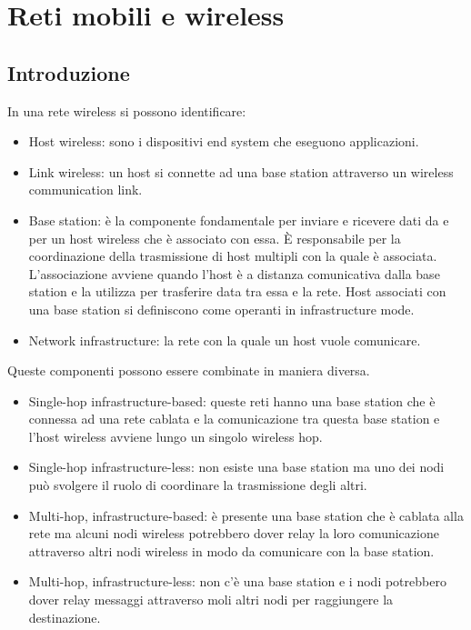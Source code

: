 \chapter{Reti mobili e wireless}
\section{Introduzione}
In  una rete wireless si possono identificare:
\begin{itemize}
\item Host wireless: sono i dispositivi end system che eseguono applicazioni.
\item Link wireless: un host si connette ad una base station attraverso un wireless communication link.
\item Base station: \`e la componente fondamentale per inviare e ricevere dati da e per un host wireless che \`e associato con essa. \`E responsabile per la coordinazione della trasmissione di host multipli con la
quale \`e associata. L'associazione avviene quando l'host \`e a distanza comunicativa dalla base station e la utilizza per trasferire data tra essa e la rete. Host associati con una base station si definiscono come 
operanti in infrastructure mode.  
\item Network infrastructure: la rete con la quale un host vuole comunicare.
\end{itemize}
Queste componenti possono essere combinate in maniera diversa.
\begin{itemize}
\item Single-hop infrastructure-based: queste reti hanno una base station che \`e connessa ad una rete cablata e la comunicazione tra questa base station e l'host wireless avviene lungo un singolo wireless hop.
\item Single-hop infrastructure-less: non esiste una base station ma uno dei nodi pu\`o svolgere il ruolo di coordinare la trasmissione degli altri.
\item Multi-hop, infrastructure-based: \`e presente una base station che \`e cablata alla rete ma alcuni nodi wireless potrebbero dover relay la loro comunicazione attraverso altri nodi wireless in modo da 
comunicare con la base station.
\item Multi-hop, infrastructure-less: non c'\`e una base station  e i nodi potrebbero dover relay messaggi attraverso moli altri nodi per raggiungere la destinazione. 
\end{itemize}
